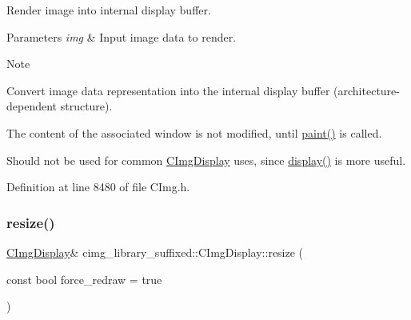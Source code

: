 Render image into internal display buffer. 


\begin{DoxyParams}{Parameters}
{\em img} & Input image data to render. \\
\hline
\end{DoxyParams}
\begin{DoxyNote}{Note}

\begin{DoxyItemize}
\item Convert image data representation into the internal display buffer (architecture-\/dependent structure).
\item The content of the associated window is not modified, until \hyperlink{structcimg__library__suffixed_1_1CImgDisplay_aff557cf3b60169ddfd4336b37c653fe0}{paint()} is called.
\item Should not be used for common \hyperlink{structcimg__library__suffixed_1_1CImgDisplay}{C\+Img\+Display} uses, since \hyperlink{structcimg__library__suffixed_1_1CImgDisplay_ad08f2f8b85cdd55d5e3ea71bdebf2b67}{display()} is more useful. 
\end{DoxyItemize}
\end{DoxyNote}


Definition at line 8480 of file C\+Img.\+h.

\mbox{\label{structcimg__library__suffixed_1_1CImgDisplay_a35a57d0053db927961c5d3a12918055a}} 
\subsubsection{\texorpdfstring{resize()}{resize()}\hspace{0.1cm}{\footnotesize\ttfamily [1/4]}}
{\footnotesize\ttfamily \hyperlink{structcimg__library__suffixed_1_1CImgDisplay}{C\+Img\+Display}\& cimg\+\_\+library\+\_\+suffixed\+::\+C\+Img\+Display\+::resize (\begin{DoxyParamCaption}\item[{const bool}]{force\+\_\+redraw = {\ttfamily true} }\end{DoxyParamCaption})\hspace{0.3cm}{\ttfamily [inline]}}



